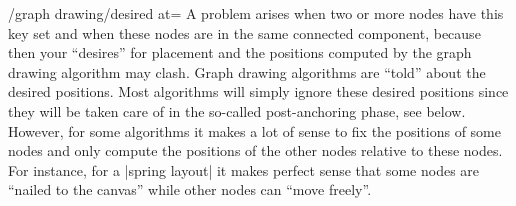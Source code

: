 \begin{key}{/graph drawing/desired at=}
  A problem arises when two or more nodes have this key set
  and when these nodes are in the same connected component, because
  then your ``desires'' for placement and the positions computed by
  the graph drawing algorithm may clash. Graph drawing algorithms are
  ``told'' about the desired positions. Most algorithms will simply
  ignore these desired positions since they will be taken care of in
  the so-called post-anchoring phase, see below. However, for some
  algorithms it makes a lot of sense to fix the positions of some
  nodes and only compute the positions 
  of the other nodes relative to these nodes. For instance, for a
  |spring layout| it makes perfect sense that some nodes are
  ``nailed to the canvas'' while other nodes can ``move freely''.
\begin{codeexample}[]
\end{codeexample}
\begin{codeexample}[]
\end{codeexample}
\begin{codeexample}[]
\end{codeexample}
\end{key}


